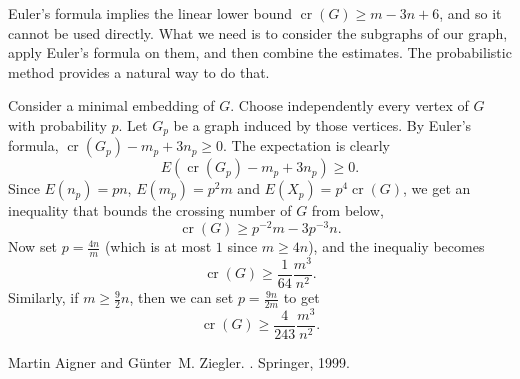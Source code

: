 \documentclass[12pt]{article}
\DeclareMathOperator{\crn}{cr}
\begin{document}
Euler's formula implies the linear lower bound $\crn(G)\geq m-3n+6$, and so it cannot be used directly. What we need is to consider the subgraphs of our graph, apply Euler's formula on them, and then combine the estimates. The probabilistic method provides a natural way to do that.

Consider a minimal embedding of $G$. Choose independently every vertex of $G$ with probability $p$. Let $G_p$ be a graph induced by those vertices. By Euler's formula, $\crn(G_p)-m_p+3n_p\geq 0$. The expectation is clearly
\begin{equation*}
E(\crn(G_p)-m_p+3n_p)\geq 0.
\end{equation*}
Since $E(n_p)=pn$, $E(m_p)=p^2 m$ and $E(X_p)=p^4\crn(G)$, we get an inequality that bounds the crossing number of $G$ from below,
\begin{equation*}
\crn(G)\geq p^{-2} m-3p^{-3}n.
\end{equation*}
Now set $p=\frac{4n}{m}$ (which is at most $1$ since $m\geq 4n$), and the inequaliy becomes 
\begin{equation*}
\crn(G)\geq \frac{1}{64}\frac{m^3}{n^2}.
\end{equation*}
Similarly, if $m\geq\frac{9}{2}n$, then we can set $p=\frac{9n}{2m}$ to get
\begin{equation*}
\crn(G)\geq \frac{4}{243}\frac{m^3}{n^2}.
\end{equation*}

\begin{thebibliography}{1}

Martin Aigner and G{\"u}nter~M. Ziegler.
.
\newblock Springer, 1999.

\end{thebibliography}

\end{document}

